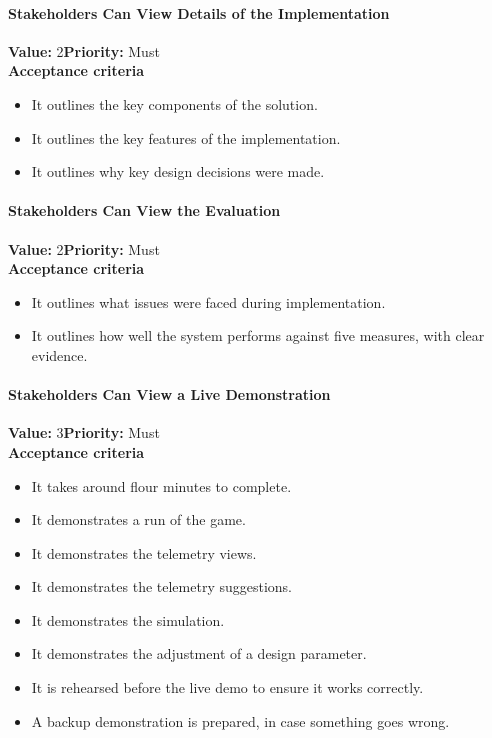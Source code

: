 \paragraph{Stakeholders Can View Details of the Implementation}
\textbf{Value:} 2\quad \textbf{Priority:} Must\\
\textbf{Acceptance criteria}
\begin{itemize}
  \item It outlines the key components of the solution.
  \item It outlines the key features of the implementation.
  \item It outlines why key design decisions were made.
\end{itemize}

\paragraph{Stakeholders Can View the Evaluation}
\textbf{Value:} 2\quad \textbf{Priority:} Must\\
\textbf{Acceptance criteria}
\begin{itemize}
  \item It outlines what issues were faced during implementation.
  \item It outlines how well the system performs against five measures, with clear evidence.
\end{itemize}

\paragraph{Stakeholders Can View a Live Demonstration}
\textbf{Value:} 3\quad \textbf{Priority:} Must\\
\textbf{Acceptance criteria}
\begin{itemize}
  \item It takes around flour minutes to complete.
  \item It demonstrates a run of the game.
  \item It demonstrates the telemetry views.
  \item It demonstrates the telemetry suggestions.
  \item It demonstrates the simulation.
  \item It demonstrates the adjustment of a design parameter.
  \item It is rehearsed before the live demo to ensure it works correctly.
  \item A backup demonstration is prepared, in case something goes wrong.
\end{itemize}

